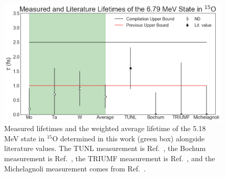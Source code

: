 \begin{figure}
\centering
\includegraphics[width=\linewidth]{figures/lifetimes679.png}
\caption{Measured lifetimes and the weighted average lifetime of the 5.18 MeV state in $^{15}$O determined in this work (green box) alongside literature values. The TUNL measurement is Ref.\ \cite{Bertone2001}, the Bochum measurement is Ref.\ \cite{Schurmann2008}, the TRIUMF measurement is Ref.\ \cite{Galinski2014}, and the Michelagnoli measurement comes from Ref.\ \cite{Michelagnoli2013}. }
\label{fig: lifetimes679}
\end{figure}



%
% 
% 
